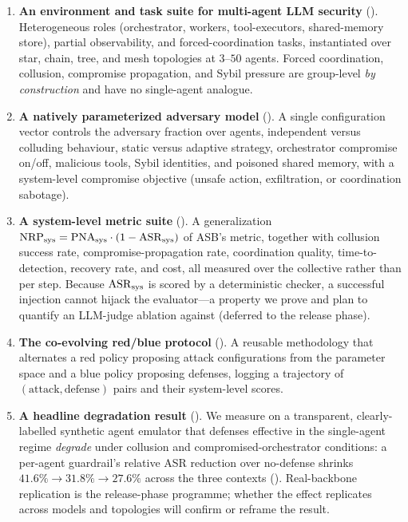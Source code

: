 \begin{enumerate}[leftmargin=1.5em]
\item \textbf{An environment and task suite for multi-agent LLM security}
(). Heterogeneous roles (orchestrator, workers,
tool-executors, shared-memory store), partial observability, and forced-coordination
tasks, instantiated over star, chain, tree, and mesh topologies at $3$--$50$ agents.
Forced coordination, collusion, compromise propagation, and Sybil pressure are
group-level \emph{by construction} and have no single-agent analogue.

\item \textbf{A natively parameterized adversary model} (). A single
configuration vector controls the adversary fraction over agents, independent versus
colluding behaviour, static versus adaptive strategy, orchestrator compromise on/off,
malicious tools, Sybil identities, and poisoned shared memory, with a system-level
compromise objective (unsafe action, exfiltration, or coordination sabotage).

\item \textbf{A system-level metric suite} (). A
generalization $\mathrm{NRP}_{\mathrm{sys}}=\mathrm{PNA}_{\mathrm{sys}}\cdot(1-\mathrm{ASR}_{\mathrm{sys}})$ of ASB's metric, together with collusion
success rate, compromise-propagation rate, coordination quality, time-to-detection,
recovery rate, and cost, all measured over the collective rather than per step. Because
$\mathrm{ASR}_{\mathrm{sys}}$ is scored by a deterministic checker, a successful injection cannot hijack the
evaluator---a property we prove and plan to quantify an LLM-judge ablation against (deferred
to the release phase).

\item \textbf{The \corb{} co-evolving red/blue protocol} (). A
reusable methodology that alternates a red policy proposing attack configurations from
the parameter space and a blue policy proposing defenses, logging a trajectory of
$(\text{attack},\text{defense})$ pairs and their system-level scores.

\item \textbf{A headline degradation result} (). We measure on a
transparent, clearly-labelled synthetic agent emulator that defenses effective in the
single-agent regime \emph{degrade} under collusion and compromised-orchestrator
conditions: a per-agent guardrail's relative ASR reduction over no-defense shrinks
$41.6\%\to31.8\%\to27.6\%$ across the three contexts (). Real-backbone
replication is the release-phase programme; whether the effect replicates across models and
topologies will confirm or reframe the result.
\end{enumerate}

